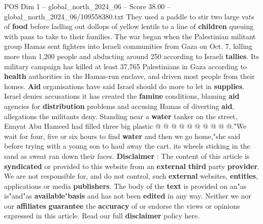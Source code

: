 \begin{textsample}{POS Dim 1 – global\_north\_2024\_06 – Score 38.00 – global\_north\_2024\_06/109558380.txt}
They used a paddle to stir two large vats of \textbf{food} before ladling out dollops of yellow lentils to a line of \textbf{children} queuing with pans to take to their families.
The war began when the Palestinian militant group Hamas sent fighters into Israeli communities from Gaza on Oct. 7, killing more than 1,200 people and abducting around 250 according to Israeli \textbf{tallies}.
Its military campaign has killed at least 37,765 Palestinians in Gaza according to \textbf{health} authorities in the Hamas-run enclave, and driven most people from their homes. \textbf{Aid} organisations have said Israel should do more to let in \textbf{supplies}.
Israel denies accusations it has created the \textbf{famine} conditions, blaming \textbf{aid} agencies for \textbf{distribution} problems and accusing Hamas of diverting \textbf{aid}, allegations the militants deny.
Standing near a \textbf{water} tanker on the street, Enayat Abu Hameed had filled three big plastic @ @ @ @ @ @ @ @ @ @."We wait for four, five or six hours to find \textbf{water} and then we go home,"she said before trying with a young son to haul away the cart, its wheels sticking in the sand as sweat ran down their faces. \textbf{Disclaimer} : The content of this article is \textbf{syndicated} or provided to this website from an \textbf{external} \textbf{third} party \textbf{provider}.
We are not responsible for, and do not control, such \textbf{external} websites, \textbf{entities}, applications or media \textbf{publishers}.
The body of the \textbf{text} is provided on an"as is"and"as \textbf{available}"\textbf{basis} and has not been \textbf{edited} in any way.
Neither we nor our \textbf{affiliates} \textbf{guarantee} the \textbf{accuracy} of or endorse the views or opinions expressed in this article.
Read our full \textbf{disclaimer} policy here.

\end{textsample}

